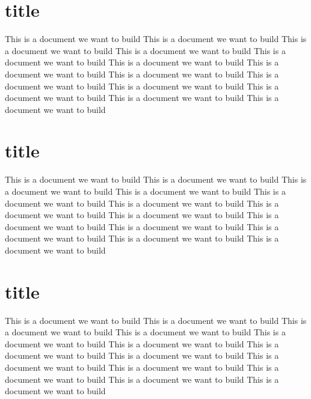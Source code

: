 \documentclass{book}
\begin{document}
	\section{title}
	This is a document we want to build	This is a document we want to build	This is a document we want to build	
	This is a document we want to build	
	This is a document we want to build	This is a document we want to build	This is a document we want to build	This is a document we want to build	
	This is a document we want to build	
	This is a document we want to build	
	This is a document we want to build	
	This is a document we want to build	
	This is a document we want to build
	\section{title}
	This is a document we want to build	This is a document we want to build	This is a document we want to build	
	This is a document we want to build	
	This is a document we want to build	This is a document we want to build	This is a document we want to build	This is a document we want to build	
	This is a document we want to build	
	This is a document we want to build	
	This is a document we want to build	
	This is a document we want to build	
	This is a document we want to build
	\section{title}
	This is a document we want to build	This is a document we want to build	This is a document we want to build	
	This is a document we want to build	
	This is a document we want to build	This is a document we want to build	This is a document we want to build	This is a document we want to build	
	This is a document we want to build	
	This is a document we want to build	
	This is a document we want to build	
	This is a document we want to build	
	This is a document we want to build
\end{document}
